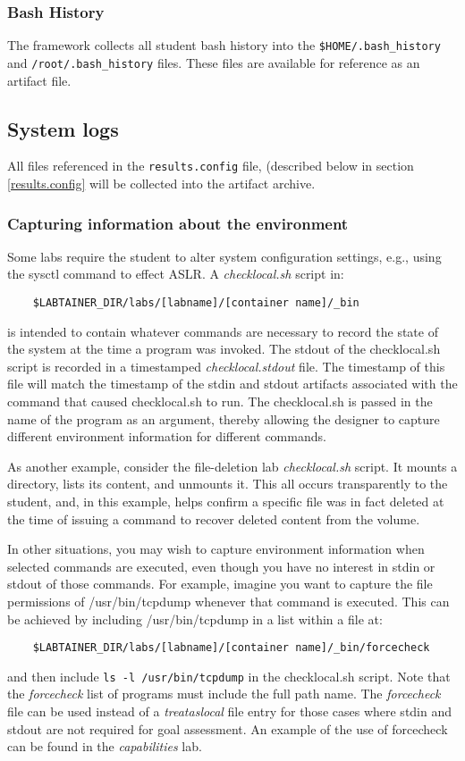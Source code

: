 \documentclass[12pt]{article}
\begin{document}
\subsubsection{Bash History}
The framework collects all student bash history into the \texttt{\$HOME/.bash\_history} and \newline
\texttt{/root/.bash\_history} files.  These files are
available for reference as an artifact file.  

\subsection{System logs}
All files referenced in the {\tt results.config} file, (described below in section \ref{results.config}
will be collected into the artifact archive.  

\subsubsection{Capturing information about the environment}
\label{checklocal}
Some labs require the student to alter system configuration settings,
e.g., using the sysctl command to effect ASLR. A \textit{checklocal.sh} script in:
\begin{verbatim}
    $LABTAINER_DIR/labs/[labname]/[container name]/_bin
\end{verbatim}
is intended to contain whatever commands are necessary to record the 
state of the system at the time a program was invoked.  The stdout of
the checklocal.sh script is recorded in a timestamped \textit{checklocal.stdout}
file.  The timestamp of this file will match the timestamp of the stdin and
stdout artifacts associated with the command that caused checklocal.sh to run.
The checklocal.sh is passed in the name of the program as an argument, thereby
allowing the designer to capture different environment information for different commands.

As another example, consider the file-deletion lab \textit{checklocal.sh} script.
It mounts a directory, lists its content, and unmounts it.  This all occurs 
transparently to the student, and, in this example, helps confirm a specific file
was in fact deleted at the time of issuing a command to recover deleted content from
the volume.

In other situations, you may wish to capture environment information when selected
commands are executed, even though you have no interest in stdin or stdout of those
commands.  For example, imagine you want to capture the file permissions of /usr/bin/tcpdump
whenever that command is executed.  This can be achieved by including /usr/bin/tcpdump in a
list within a file at:
\begin{verbatim}
    $LABTAINER_DIR/labs/[labname]/[container name]/_bin/forcecheck
\end{verbatim}
\noindent and then include \texttt{ls -l /usr/bin/tcpdump} in the checklocal.sh script.
Note that the \textit{forcecheck} list of programs must include the full path name.
The \textit{forcecheck} file can be used instead of a \textit{treataslocal} file entry
for those cases where stdin and stdout are not required for goal assessment.  An example of the use of
forcecheck can be found in the \textit{capabilities} lab.  
\end{document}
